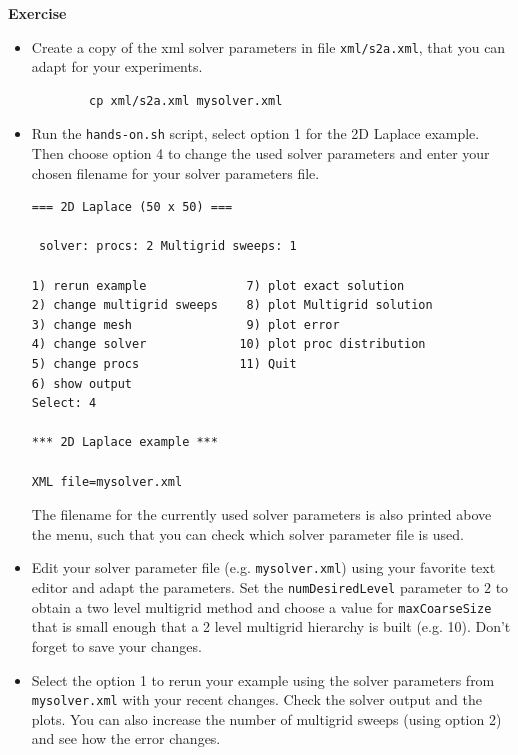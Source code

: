 \documentclass[12pt,a4paper]{article}
\begin{document}
\begin{graybox}
 \textbf{Exercise}
 \begin{itemize}
  \item Create a copy of the xml solver parameters in file \verb|xml/s2a.xml|, that you can adapt for your experiments.
        \begin{verbatim}
        cp xml/s2a.xml mysolver.xml
        \end{verbatim}
  \item Run the \verb|hands-on.sh| script, select option 1 for the 2D Laplace example. Then choose option 4 to change the used solver parameters and enter your chosen filename for your solver parameters file.
        \begin{verbatim}
=== 2D Laplace (50 x 50) ===

 solver: procs: 2 Multigrid sweeps: 1

1) rerun example              7) plot exact solution
2) change multigrid sweeps    8) plot Multigrid solution
3) change mesh                9) plot error
4) change solver             10) plot proc distribution
5) change procs              11) Quit
6) show output
Select: 4

*** 2D Laplace example ***

XML file=mysolver.xml
        \end{verbatim}
        The filename for the currently used solver parameters is also printed above the menu, such that you can check which solver parameter file is used.
   \item Edit your solver parameter file (e.g. \verb|mysolver.xml|) using your favorite text editor and adapt the parameters. Set the \texttt{numDesiredLevel} parameter to $2$ to obtain a two level multigrid method and choose a value for \texttt{maxCoarseSize} that is small enough that a 2 level multigrid hierarchy is built (e.g. 10). Don't forget to save your changes.
   \item Select the option 1 to rerun your example using the solver parameters from \verb|mysolver.xml| with your recent changes. Check the solver output and the plots. You can also increase the number of multigrid sweeps (using option 2) and see how the error changes.
 \end{itemize}
\end{graybox}
\end{document}
